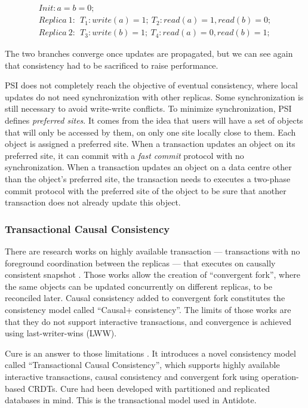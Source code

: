 \documentclass[11pt]{article}
\begin{document}
\setcounter{equation}{0}
\begin{gather}
	Init: a = b = 0; \\
	Replica\ 1:\ \ T_1: write(a) = 1;\ T_2: read(a) = 1, read(b) = 0; \\
	Replica\ 2:\ \ T_3: write(b) = 1;\ T_4: read(a) = 0, read(b) = 1;
\end{gather}

The two branches converge once updates are propagated, but we can see again
that consistency had to be sacrificed to raise performance.

PSI does not completely reach the objective of eventual consistency, where
local updates do not need synchronization with other replicas. Some
synchronization is still necessary to avoid write-write conflicts. To minimize
synchronization, PSI defines \emph{preferred sites}. It comes from the idea
that users will have a set of objects that will only be accessed by them, on
only one site locally close to them. Each object is assigned a preferred site.
When a transaction updates an object on its preferred site, it can commit with
a \emph{fast commit} protocol with no synchronization. When a transaction
updates an object on a data centre other than the object's preferred site, the
transaction needs to executes a two-phase commit protocol with the preferred
site of the object to be sure that another transaction does not already update
this object.


\subsubsection{Transactional Causal Consistency}
\label{sec:cure}

There are research works on highly available transaction --- transactions with
no foreground coordination between the replicas --- that executes on causally
consistent snapshot \cite{Gentlerain2014, Lloyd2011}. Those works allow the
creation of ``convergent fork'', where the same objects can be updated
concurrently on different replicas, to be reconciled later. Causal consistency
added to convergent fork constitutes the consistency model called ``Causal+
consistency''. The limits of those works are that they do not support
interactive transactions, and convergence is achieved using last-writer-wins
(LWW).

Cure is an answer to those limitations \cite{Cure2016}. It introduces a novel
consistency model called ``Transactional Causal Consistency'', which supports
highly available interactive transactions, causal consistency and convergent
fork using operation-based CRDTs. Cure had been developed with partitioned and
replicated databases in mind. This is the transactional model used in
Antidote.
\end{document}

